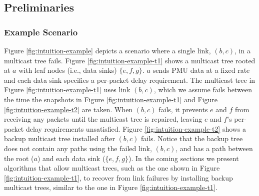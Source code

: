 \subsection{Preliminaries} 
\label{subsec:scenario}

\subsubsection{Example Scenario}

Figure \ref{fig:intuition-example} depicts a scenario where a single link, $(b,c)$, in a multicast tree fails.  %
Figure \ref{fig:intuition-example-t1} shows a multicast tree rooted at $a$ with leaf nodes (i.e., data sinks) $\{e,f,g\}$.  $a$ sends PMU data at a fixed rate and each data sink specifies a per-packet delay requirement. 
The multicast tree in Figure \ref{fig:intuition-example-t1} uses link $(b,c)$, which  we assume fails between the time the snapshots in Figure \ref{fig:intuition-example-t1} and Figure \ref{fig:intuition-example-t2} are taken.
When $(b,c)$ fails, it prevents $e$ and $f$ from receiving any packets until the multicast tree is repaired, leaving $e$ and $f$'s per-packet delay requirements unsatisfied. 
Figure \ref{fig:intuition-example-t2} shows a backup multicast tree installed after $(b,c)$ fails.  Notice that the backup tree does not contain any paths using the failed link, $(b,c)$, and has a path between the root ($a$) and each data sink ($\{e,f,g\}$).  
In the coming sections we present algorithms that allow multicast trees, such as the one shown in Figure \ref{fig:intuition-example-t1}, to recover from link failures by installing backup multicast trees, similar to the one in Figure \ref{fig:intuition-example-t1}.

